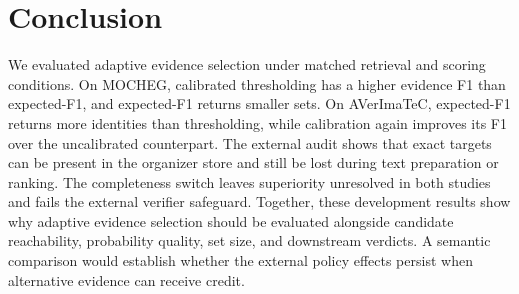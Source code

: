 \section{Conclusion}
\label{sec:conclusion}

We evaluated adaptive evidence selection under matched retrieval and scoring conditions. On MOCHEG, calibrated thresholding has a higher evidence F1 than expected-F1, and expected-F1 returns smaller sets. On AVerImaTeC, expected-F1 returns more identities than thresholding, while calibration again improves its F1 over the uncalibrated counterpart. The external audit shows that exact targets can be present in the organizer store and still be lost during text preparation or ranking. The completeness switch leaves superiority unresolved in both studies and fails the external verifier safeguard. Together, these development results show why adaptive evidence selection should be evaluated alongside candidate reachability, probability quality, set size, and downstream verdicts. A semantic comparison would establish whether the external policy effects persist when alternative evidence can receive credit.
